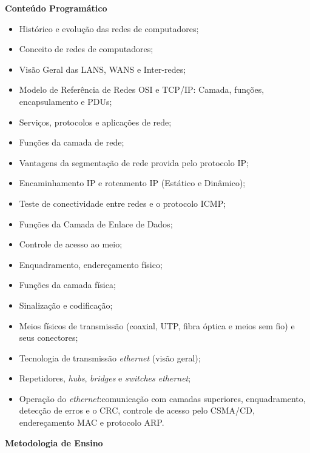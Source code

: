 
\begin{snugshade}\begin{center}\textbf{
    Conteúdo Programático
}\end{center}\end{snugshade}

\begin{itemize}

 \item Histórico e evolução das redes de computadores;
 \item Conceito de redes de computadores;
 \item Visão Geral das LANS, WANS e Inter-redes;
 \item Modelo de Referência de Redes OSI e TCP/IP: Camada, funções, encapsulamento e PDUs;
 \item Serviços, protocolos e aplicações de rede;
 \item Funções da camada de rede;
 \item Vantagens da segmentação de rede provida pelo protocolo IP;
 \item Encaminhamento IP e roteamento IP (Estático e Dinâmico);
 \item Teste de conectividade entre redes e o protocolo ICMP;
 \item Funções da Camada de Enlace de Dados;
 \item Controle de acesso ao meio;
 \item Enquadramento, endereçamento físico;
 \item Funções da camada física;
 \item Sinalização e codificação;
 \item Meios físicos de transmissão (coaxial, UTP, fibra óptica e meios sem fio) e seus conectores;
 \item Tecnologia de transmissão \textit{ethernet} (visão geral);
 \item Repetidores, \textit{hubs}, \textit{bridges} e \textit{switches ethernet};
 \item Operação do \textit{ethernet}:comunicação com camadas superiores, enquadramento, detecção de erros e o CRC, controle de acesso pelo CSMA/CD, endereçamento MAC e protocolo ARP.
 
\end{itemize}

\begin{snugshade}\begin{center}\textbf{
    Metodologia de Ensino
}\end{center}\end{snugshade}

